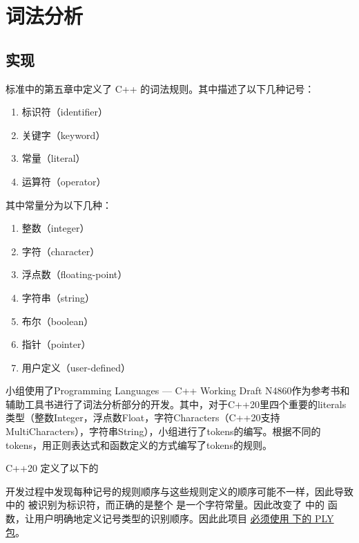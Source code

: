 \section{词法分析}

\subsection{实现}

标准中的第五章中定义了 C++ 的词法规则。其中描述了以下几种记号：

\begin{multicols}{2}
    \begin{enumerate}
        \item 标识符（identifier）
        \item 关键字（keyword）
        \item 常量（literal）
        \item 运算符（operator）
    \end{enumerate}
\end{multicols}


其中常量分为以下几种：
\begin{multicols}{2}
    \begin{enumerate}
        \item 整数（integer）
        \item 字符（character）
        \item 浮点数（floating-point）
        \item 字符串（string）
        \item 布尔（boolean）
        \item 指针（pointer）
        \item 用户定义（user-defined）
    \end{enumerate}
\end{multicols}

小组使用了Programming Languages — C++ Working Draft N4860作为参考书和辅助工具书进行了词法分析部分的开发。其中，对于C++20里四个重要的literals类型（整数Integer，浮点数Float，字符Characters（C++20支持MultiCharacters），字符串String），小组进行了tokens的编写。根据不同的tokens，用正则表达式和函数定义的方式编写了tokens的规则。

C++20 定义了以下的

开发过程中发现每种记号的规则顺序与这些规则定义的顺序可能不一样，因此导致  中的  被识别为标识符，而正确的是整个  是一个字符常量。因此改变了  中的  函数，让用户明确地定义记号类型的识别顺序。因此此项目 \underline{必须使用  下的 PLY 包}。


